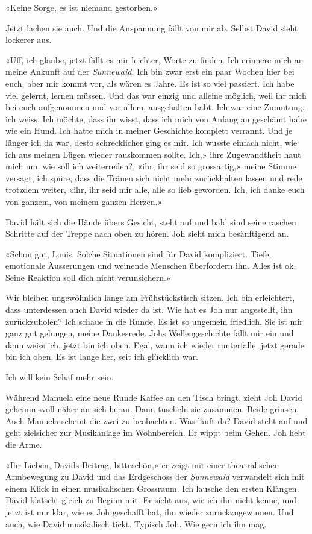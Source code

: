 «Keine Sorge, es ist niemand gestorben.»

Jetzt lachen sie auch. Und die Anspannung fällt von mir ab. Selbst David
sieht lockerer aus.

«Uff, ich glaube, jetzt fällt es mir leichter, Worte zu finden. Ich
erinnere mich an meine Ankunft auf der \emph{Sunnewaid}. Ich bin zwar
erst ein paar Wochen hier bei euch, aber mir kommt vor, als wären es
Jahre. Es ist so viel passiert. Ich habe viel gelernt, lernen müssen.
Und das war einzig und alleine möglich, weil ihr mich bei euch
aufgenommen und vor allem, ausgehalten habt. Ich war eine Zumutung, ich
weiss. Ich möchte, dass ihr wisst, dass ich mich von Anfang an geschämt
habe wie ein Hund. Ich hatte mich in meiner Geschichte komplett
verrannt. Und je länger ich da war, desto schrecklicher ging es mir. Ich
wusste einfach nicht, wie ich aus meinen Lügen wieder rauskommen sollte.
Ich,» ihre Zugewandtheit haut mich um, wie soll ich weiterreden?, «ihr,
ihr seid so grossartig,» meine Stimme versagt, ich spüre, dass die
Tränen sich nicht mehr zurückhalten lassen und rede trotzdem weiter,
«ihr, ihr seid mir alle, alle so lieb geworden. Ich, ich danke euch von
ganzem, von meinem ganzen Herzen.»

David hält sich die Hände übers Gesicht, steht auf und bald sind seine
raschen Schritte auf der Treppe nach oben zu hören.
Joh sieht mich besänftigend an.

«Schon gut, Louis. Solche Situationen sind für David kompliziert. 
Tiefe, emotionale Äusserungen und weinende Menschen überfordern ihn. 
Alles ist ok. Seine Reaktion soll dich nicht verunsichern.»

Wir bleiben ungewöhnlich lange am Frühstückstisch sitzen. Ich bin
erleichtert, dass unterdessen auch David wieder da ist. Wie hat es Joh
nur angestellt, ihn zurückzuholen?
Ich schaue in die Runde. Es ist so ungemein friedlich. Sie ist mir ganz
gut gelungen, meine Dankesrede.
Johs Wellengeschichte fällt mir ein und dann weiss ich, jetzt bin ich
oben. Egal, wann ich wieder runterfalle, jetzt gerade bin ich oben. Es
ist lange her, seit ich glücklich war. 

Ich will kein Schaf mehr sein.

Während Manuela eine neue Runde Kaffee an den Tisch bringt, zieht Joh
David geheimnisvoll näher an sich heran. Dann tuscheln sie zusammen.
Beide grinsen. Auch Manuela scheint die zwei zu beobachten. Was läuft
da?
David steht auf und geht zielsicher zur Musikanlage im Wohnbereich. Er
wippt beim Gehen. Joh hebt die Arme.

«Ihr Lieben, Davids Beitrag, bitteschön,» er zeigt mit einer theatralischen
Armbewegung zu David und das Erdgeschoss der \emph{Sunnewaid}
verwandelt sich mit einem Klick in einen musikalischen Grossraum.
Ich lausche den ersten Klängen. David klatscht gleich zu Beginn mit. Er
sieht aus, wie ich ihn nicht kenne, und jetzt ist mir klar, wie es Joh
geschafft hat, ihn wieder zurückzugewinnen. Und auch, wie David
musikalisch tickt.
Typisch Joh. Wie gern ich ihn mag.

